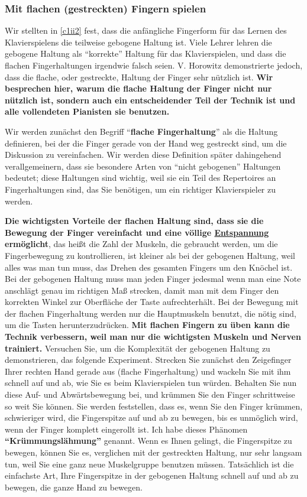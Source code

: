 
\subsubsection{Mit flachen (gestreckten) Fingern spielen}
\label{c1iii4b}

Wir stellten in \hyperref[c1ii2]{\autoref{c1ii2}} fest, dass die anfängliche Fingerform für das Lernen des Klavierspielens die teilweise gebogene Haltung ist.
Viele Lehrer lehren die gebogene Haltung als \enquote{korrekte} Haltung für das Klavierspielen, und dass die flachen Fingerhaltungen irgendwie falsch seien.
V. Horowitz demonstrierte jedoch, dass die flache, oder gestreckte, Haltung der Finger sehr nützlich ist.
\textbf{Wir besprechen hier, warum die flache Haltung der Finger nicht nur nützlich ist, sondern auch ein entscheidender Teil der Technik ist und alle vollendeten Pianisten sie benutzen.}

Wir werden zunächst den Begriff \enquote{\textbf{flache Fingerhaltung}} als die Haltung definieren, bei der die Finger gerade von der Hand weg gestreckt sind, um die Diskussion zu vereinfachen.
Wir werden diese Definition später dahingehend verallgemeinern, dass sie besondere Arten von \enquote{nicht gebogenen} Haltungen bedeutet; diese Haltungen sind wichtig, weil sie ein Teil des Repertoires an Fingerhaltungen sind, das Sie benötigen, um ein richtiger Klavierspieler zu werden.

\textbf{Die wichtigsten Vorteile der flachen Haltung sind, dass sie die Bewegung der Finger vereinfacht und eine völlige \hyperref[c1ii14]{Entspannung} ermöglicht}, das heißt die Zahl der Muskeln, die gebraucht werden, um die Fingerbewegung zu kontrollieren, ist kleiner als bei der gebogenen Haltung, weil alles was man tun muss, das Drehen des gesamten Fingers um den Knöchel ist.
Bei der gebogenen Haltung muss man jeden Finger jedesmal wenn man eine Note anschlägt genau im richtigen Maß strecken, damit man mit dem Finger den korrekten Winkel zur Oberfläche der Taste aufrechterhält.
Bei der Bewegung mit der flachen Fingerhaltung werden nur die Hauptmuskeln benutzt, die nötig sind, um die Tasten herunterzudrücken.
\textbf{Mit flachen Fingern zu üben kann die Technik verbessern, weil man nur die wichtigsten Muskeln und Nerven trainiert.}
Versuchen Sie, um die Komplexität der gebogenen Haltung zu demonstrieren, das folgende Experiment.
Strecken Sie zunächst den Zeigefinger Ihrer rechten Hand gerade aus (flache Fingerhaltung) und wackeln Sie mit ihm schnell auf und ab, wie Sie es beim Klavierspielen tun würden.
Behalten Sie nun diese Auf- und Abwärtsbewegung bei, und krümmen Sie den Finger schrittweise so weit Sie können.
Sie werden feststellen, dass es, wenn Sie den Finger krümmen, schwieriger wird, die Fingerspitze auf und ab zu bewegen, bis es unmöglich wird, wenn der Finger komplett eingerollt ist.
Ich habe dieses Phänomen \textbf{\enquote{Krümmungslähmung}} genannt.
Wenn es Ihnen gelingt, die Fingerspitze zu bewegen, können Sie es, verglichen mit der gestreckten Haltung, nur sehr langsam tun, weil Sie eine ganz neue Muskelgruppe benutzen müssen.
Tatsächlich ist die einfachste Art, Ihre Fingerspitze in der gebogenen Haltung schnell auf und ab zu bewegen, die ganze Hand zu bewegen.

